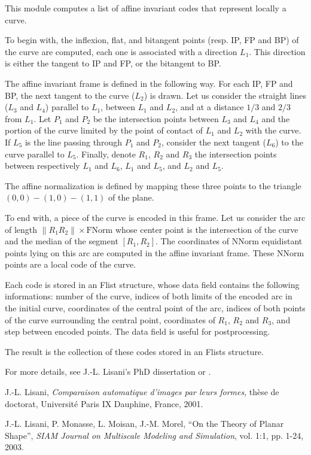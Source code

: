 This module computes a list of affine invariant codes that represent locally a curve.

To begin with, the inflexion, flat, and bitangent points (resp. IP, FP and BP) of the curve are computed, each one is associated with a direction $L_1$. This direction is either the tangent to IP and FP, or the bitangent to BP.

The affine invariant frame is defined in the following way. For each IP, FP and BP, the next tangent to the curve ($L_2$) is drawn. Let us consider the straight lines ($L_3$ and $L_4$) parallel to $L_1$, between $L_1$ and $L_2$, and at a distance $1/3$ and $2/3$ from $L_1$. Let $P_1$ and $P_2$ be the intersection points between $L_3$ and $L_4$ and the portion of the curve limited by the point of contact of $L_1$ and $L_2$ with the curve. If $L_5$ is the line passing through $P_1$ and $P_2$, consider the next tangent ($L_6$) to the curve parallel to $L_5$. Finally, denote $R_1$, $R_2$ and $R_3$ the intersection points between respectively $L_1$ and $L_6$, $L_1$ and $L_5$, and $L_2$ and $L_5$.

The affine normalization is defined by mapping these three points to the triangle $(0,0)-(1,0)-(1,1)$ of the plane.

To end with, a piece of the curve is encoded in this frame. Let us consider the arc of length $\| R_1R_2 \| \times \mbox{FNorm}$ whose center point is the intersection of the curve and the median of the segment $[R_1,R_2]$. The coordinates of $\mbox{NNorm}$ equidistant points lying on this arc are computed in the affine invariant frame. These $\mbox{NNorm}$ points are a local code of the curve.

\medskip

Each code is stored in an Flist structure, whose data field contains the following informations: number of the curve, indices of both limits of the encoded arc in the initial curve, coordinates of the central point of the arc, indices of both points of the curve surrounding the central point, coordinates of $R_1$, $R_2$ and $R_3$, and step between encoded points. The data field is useful for postprocessing.

The result is the collection of these codes stored in an Flists structure.

\medskip

For more details, see J.-L. Lisani's PhD dissertation \cite{joseluis} 
or \cite{LMMM}.

\medskip

\begin{thebibliography}{9}

 J.-L. {\sc Lisani}, {\it Comparaison automatique
d'images par leurs formes}, th\`ese de doctorat, Universit\'e Paris IX
Dauphine, France, 2001.

 J.-L. Lisani, P. Monasse, L. Moisan, J.-M. Morel, 
``On the Theory of Planar Shape'', 
{\it SIAM Journal on Multiscale Modeling and Simulation}, 
vol. 1:1, pp. 1-24, 2003. 

\end{thebibliography}
